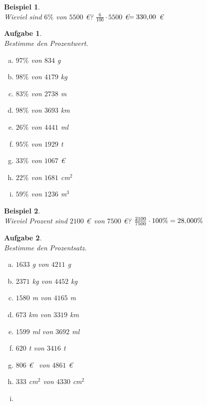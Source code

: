 \documentclass[12pt,fleqn]{article}
\theoremstyle{aufg}
\newtheorem{aufgabe}{Aufgabe}
\theoremstyle{bsp}
\newtheorem{beispiel}{Beispiel}
\begin{document}
 
    \begin{flushleft}
\begin{beispiel} ~ \\ 
Wieviel sind $6\%$ von $5500$ \euro? $\frac{6}{100}\cdot 5500$ \euro $ = 330,\hspace{-1pt}00$ \euro\end{beispiel} 
\begin{aufgabe} ~ \\ 
Bestimme den Prozentwert.\begin{multicols}{3} 
\begin{enumerate}[a)] 
\item 
$97\%$ von $834$ g
\item 
$98\%$ von $4179$ kg
\item 
$83\%$ von $2738$ m
\item 
$98\%$ von $3693$ km
\item 
$26\%$ von $4441$ ml
\item 
$95\%$ von $1929$ t
\item 
$33\%$ von $1067$ \euro~
\item 
$22\%$ von $1681$ cm$^2$
\item 
$59\%$ von $1236$ m$^3$
\end{enumerate} 
\end{multicols} 
\end{aufgabe} 
\begin{beispiel} ~ \\ 
Wieviel Prozent sind $2100$ \euro~von $7500$ \euro? $\frac{2100}{7500}\cdot 100\%  = 28,\hspace{-1pt}000\%$ \end{beispiel} 
\begin{aufgabe} ~ \\ 
Bestimme den Prozentsatz.\begin{multicols}{3} 
\begin{enumerate}[a)] 
\item 
$1633$ g von $4211$ g
\item 
$2371$ kg von $4452$ kg
\item 
$1580$ m von $4165$ m
\item 
$673$ km von $3319$ km
\item 
$1599$ ml von $3692$ ml
\item 
$620$ t von $3416$ t
\item 
$806$ \euro~ von $4861$ \euro~
\item 
$333$ cm$^2$ von $4330$ cm$^2$
\item 

\end{enumerate}
\end{multicols}
\end{aufgabe}
\end{flushleft}
\end{document}
